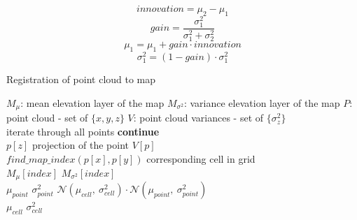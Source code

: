 \begin{itemize}
        \begin{equation}
            innovation = \mu_2 - \mu_1
        \end{equation}
        \begin{equation}
            gain = \frac {\sigma^2_1} {\sigma^2_1 + \sigma^2_2}
        \end{equation}
        \begin{equation}
            \mu_1 = \mu_1 + gain \cdot innovation
        \end{equation}
        \begin{equation}
            \sigma^2_1 = \left( 1 - gain \right) \cdot \sigma^2_1
        \end{equation}

        \begin{algorithm}
            \caption{Registration of point cloud to map}
            \label{alg:map_update}
            \begin{algorithmic}[1]
                \State $M_\mu$: mean elevation layer of the map
                \State $M_{\sigma^2}$: variance elevation layer of the map
                \State $P$: point cloud - set of $\{x, y, z\}$
                \State $V$: point cloud variances - set of $\{\sigma^2_z\}$ \\

                    \Comment iterate through all points
                        \State \textbf{continue}
                    \EndIf \\

                     {$p[z]$}
                    \Comment projection of the point
                     {$V[p]$} \\

                     {$find\_map\_index(p[x], p[y])$}
                    \Comment corresponding cell in grid \\

                     {$M_\mu[index]$}
                     {$M_{\sigma^2}[index]$} \\

                         {$\mu_{point}$}
                         {$\sigma^2_{point}$}
                    \Else
                            {$\mathcal{N}(\mu_{cell} ,\ \sigma^2_{cell}) \cdot
                                \mathcal{N}(\mu_{point} ,\ \sigma^2_{point})$}
                            \label{op:fuse}
                    \EndIf \\

                     {$\mu_{cell}$}
                     {$\sigma^2_{cell}$}
                \EndFor
            \end{algorithmic}
        \end{algorithm}
\end{itemize}

